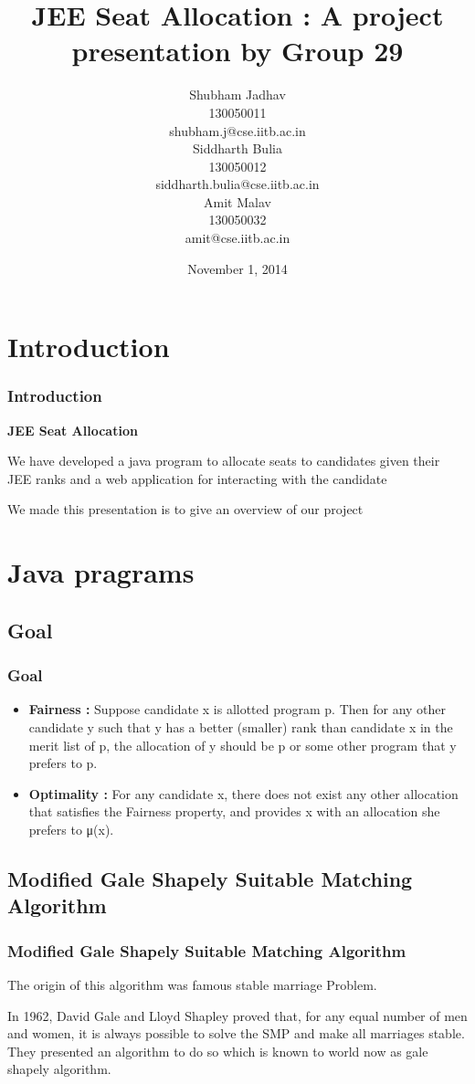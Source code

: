 \documentclass{beamer}
\title{JEE Seat Allocation : A project presentation by Group 29}
\author{Shubham Jadhav \\
{\tiny 130050011}  \\
	{\tiny shubham.j@cse.iitb.ac.in}  \\
    Siddharth Bulia \\
    {\tiny 130050012}  \\
   { \tiny siddharth.bulia@cse.iitb.ac.in } \\
    Amit Malav  \\
    {\tiny 130050032}  \\
    {\tiny amit@cse.iitb.ac.in}
}
\date{November 1, 2014}
\begin{document}
\begin{frame}
\titlepage
\end{frame}

\section{Introduction}

\begin{frame}
\frametitle{Introduction}
\begin{center}
 {\bf JEE Seat Allocation } 

\end{center}
\vskip 0.5in
\pause
We have developed a java program to allocate seats to candidates given their JEE ranks and a web application for interacting with the candidate \\
\pause 

We made this presentation is to give an overview of our project

\end{frame}







\section{Java pragrams}
\subsection {Goal}
\begin{frame}
\frametitle{Goal}
\pause
\begin{itemize}
\item {\bf Fairness : } Suppose candidate x is allotted program p. Then for any other candidate y such that y has a better (smaller) rank than candidate x in the merit list of p, the allocation of y should be p or some other program that y prefers to p.
\pause
\item {\bf Optimality :} For any candidate x, there does not exist any other allocation that satisfies the Fairness property, and provides x with an allocation she prefers to μ(x).
\end{itemize}
\end{frame}


\subsection {Modified Gale Shapely Suitable Matching Algorithm}
\begin{frame}
\frametitle{Modified Gale Shapely Suitable Matching Algorithm}
\pause

\pause
The origin of this algorithm was famous stable marriage Problem.

\pause
In 1962, David Gale and Lloyd Shapley proved that, for any equal number of men and women, it is always possible to solve the SMP and make all marriages stable. They presented an algorithm to do so which is known to world now as gale shapely algorithm.

\end{frame}
\end{document}
